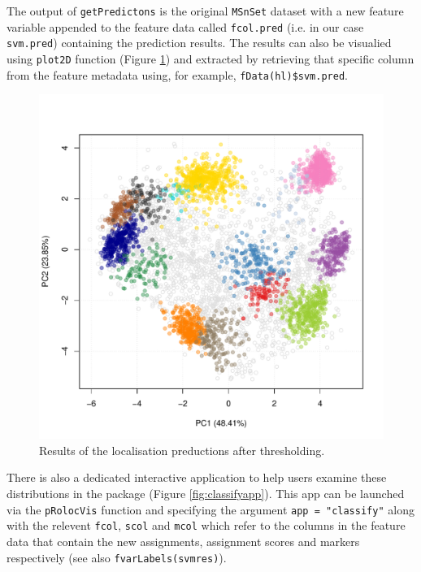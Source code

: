 The output of \texttt{getPredictons} is the original \texttt{MSnSet}
dataset with a new feature variable appended to the feature data
called \texttt{fcol.pred} (i.e. in our case \texttt{svm.pred})
containing the prediction results. The results can also be visualied
using \texttt{plot2D} function (Figure \ref{fig:plotres}) and
extracted by retrieving that specific column from the feature metadata
using, for example, \texttt{fData(hl)\$svm.pred}.



\begin{figure}[!ht]
    \centering
\begin{knitrout}
\color{fgcolor}\begin{kframe}
\begin{alltt}
  \hlstd{=} \hlstd{)}
\end{alltt}
\end{kframe}
\includegraphics[width=.7\textwidth]{figure/plotres-1} 

\end{knitrout}
  \caption{Results of the localisation preductions after thresholding.}
  \label{fig:plotres}
\end{figure}


There is also a dedicated interactive application to help users
examine these distributions in the  package (Figure
\ref{fig:classifyapp}).  This app can be launched via the
\texttt{pRolocVis} function and specifying the argument \texttt{app =
  "classify"} along with the relevent \texttt{fcol}, \texttt{scol} and
\texttt{mcol} which refer to the columns in the feature data that
contain the new assignments, assignment scores and markers
respectively (see also \texttt{fvarLabels(svmres)}).

